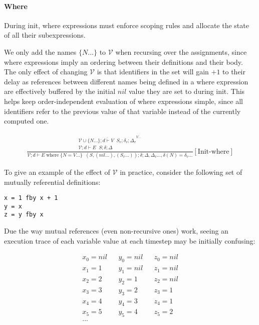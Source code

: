 \documentclass{scrartcl}
\DeclareMathOperator{\where}{where}
\DeclareMathOperator{\initrel}{\overset{init}{\Rightarrow}}
\begin{document}
    \paragraph{Where}
    
    During init, where expressions must enforce scoping rules and allocate the state of all their subexpressions.
    
    We only add the names $\{N...\}$ to $\mathcal{V}$ when recursing over the assignments, since where expressions imply an ordering between their definitions and their body. The only effect of changing $\mathcal{V}$ is that identifiers in the set will gain $+1$ to their delay as references between different names being defined in a where expression are effectively buffered by the initial $nil$ value they are set to during init. This helps keep order-independent evaluation of where expressions simple, since all identifiers refer to the previous value of that variable instead of the currently computed one.
    
    \begin{align*}
    \frac{
        \begin{matrix}
        \overline{\mathcal{V} \cup \{N...\}; d \vdash V \initrel S_v; \delta_v; \Delta_v}^{V...} \\
        \mathcal{V}; d \vdash E \initrel S; \delta; \Delta
        \end{matrix}
    }{
        \mathcal{V}; d \vdash E \where \{ N=V... \} \initrel (S, (nil...), (S_v...)); \delta; \Delta, \Delta_v..., \delta(N)=\delta_v...
    }[\text{Init-where}]
    \end{align*}
    
    To give an example of the effect of $\mathcal{V}$ in practice, consider the following set of mutually referential definitions:
    
    \begin{lstlisting}
x = 1 fby x + 1
y = x
z = y fby x
    \end{lstlisting}
    
    Due the way mutual references (even non-recursive ones) work, seeing an execution trace of each variable value at each timestep may be initially confusing:
    
    \begin{align*}
    x_0 = nil && y_0 = nil && z_0 = nil \\
    x_1 = 1 && y_1 = nil && z_1 = nil \\
    x_2 = 2 && y_2 = 1 && z_2 = nil \\
    x_3 = 3 && y_3 = 2 && z_3 = 1 \\
    x_4 = 4 && y_4 = 3 && z_4 = 1 \\
    x_5 = 5 && y_5 = 4 && z_5 = 2 \\
    ...
    \end{align*}
    
\end{document}
